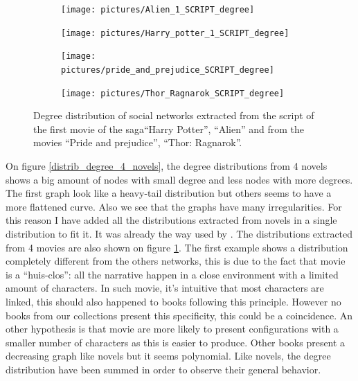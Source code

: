\documentclass[a4paper, 12pt]{report}
\begin{document}
\begin{figure}
\begin{subfigure}{.49\textwidth}
\centering
\texttt{[image: pictures/Alien\_1\_SCRIPT\_degree]}
\end{subfigure}
\hfill
\begin{subfigure}{.49\textwidth}
\centering
\texttt{[image: pictures/Harry\_potter\_1\_SCRIPT\_degree]}
\end{subfigure}
\hfill
\begin{subfigure}{.49\textwidth}
\centering
\texttt{[image: pictures/pride\_and\_prejudice\_SCRIPT\_degree]}
\end{subfigure}
\begin{subfigure}{.49\textwidth}
\centering
\texttt{[image: pictures/Thor\_Ragnarok\_SCRIPT\_degree]}
\end{subfigure}
\caption{Degree distribution of social networks extracted from the script of the first movie of the saga``Harry Potter'', ``Alien'' and from the movies ``Pride and prejudice'', ``Thor: Ragnarok''.}
\label{distrib_degree_4_scripts}
\end{figure}

On figure \ref{distrib_degree_4_novels}, the degree distributions from 4 novels shows a big amount of nodes with small degree and less nodes with more degrees. The first graph look like a heavy-tail distribution but others seems to have a more flattened curve. Also we see that the graphs have many irregularities. For this reason I have added all the distributions extracted from novels in a single distribution to fit it. It was already the way used by \cite{original}.
The distributions extracted from 4 movies are also shown on figure \ref{distrib_degree_4_scripts}. The first example shows a distribution completely different from the others networks, this is due to the fact that movie is a ``huis-clos'': all the narrative happen in a close environment with a limited amount of characters. In such movie, it's intuitive that most characters are linked, this should also happened to books following this principle. However no books from our collections present this specificity, this could be a coincidence. An other hypothesis is that movie are more likely to present configurations with a smaller number of characters as this is easier to produce. Other books present a decreasing graph like novels but it seems polynomial. Like novels, the degree distribution have been summed in order to observe their general behavior.
\end{document}
